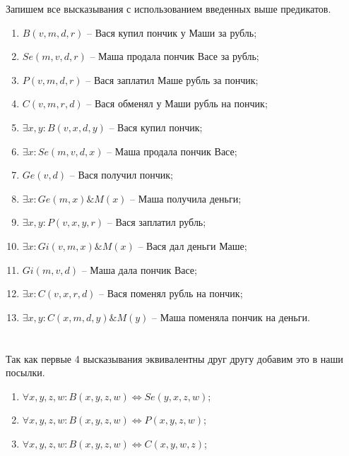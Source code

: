 \documentclass[a4paper,14pt]{article} %
\begin{document}
Запишем все высказывания с использованием введенных выше предикатов.
\begin{enumerate}
    \item \label{1} $B(v, m, d, r)$ -- Вася купил пончик у Маши за рубль;
    \item \label{2} $Se(m, v, d, r)$ -- Маша продала пончик Васе за рубль;
    \item \label{3} $P(v, m, d, r)$ -- Вася заплатил Маше рубль за пончик;
    \item \label{4} $C(v, m, r, d)$ -- Вася обменял у Маши рубль на пончик;
    \item \label{5} $\exists x, y: B(v, x, d, y)$  -- Вася купил пончик;
    \item \label{6} $\exists x: Se(m, v, d, x)$ -- Маша продала пончик Васе;
    \item \label{7} $Ge(v, d)$ -- Вася получил пончик;
    \item \label{8} $\exists x: Ge(m, x) \& M(x)$ -- Маша получила деньги;
    \item \label{9} $\exists x, y: P(v, x, y, r)$ -- Вася заплатил рубль;
    \item \label{10} $\exists x: Gi(v, m, x) \& M(x)$ --  Вася дал деньги Маше;
    \item \label{11} $Gi(m, v, d)$ --  Маша дала пончик Васе;
    \item \label{12} $\exists x: C(v, x, r, d)$ --  Вася поменял рубль на пончик;
    \item \label{13} $\exists x, y: C(x, m, d, y)\&M(y)$ --  Маша поменяла пончик на деньги.
\end{enumerate}


\section{}
Так как первые 4 высказывания эквивалентны друг другу добавим это в наши посылки.
\begin{enumerate}
    \item $\forall x,y,z,w: B(x, y, z, w) \Leftrightarrow Se(y, x, z, w)$;
    \item $\forall x,y,z,w: B(x, y, z, w) \Leftrightarrow P(x, y, z, w)$;
    \item $\forall x,y,z,w: B(x, y, z,w) \Leftrightarrow C(x, y, w, z)$;
\end{enumerate}
\end{document}
